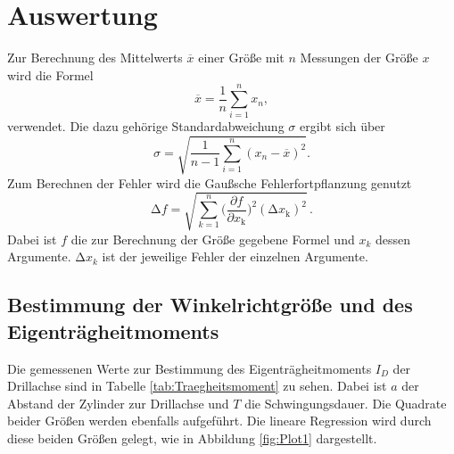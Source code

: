 \section{Auswertung}
\label{sec:Auswertung}
Zur Berechnung des Mittelwerts $\overline{x}$ einer Größe mit $n$ Messungen der Größe $x$ wird die Formel 
\begin{equation}
  \overline{x}=\frac{1}{n}\sum_{i=1}^n x_n,
  \label{eq:Mittelwert}
\end{equation} verwendet.
Die dazu gehörige Standardabweichung $\sigma$ ergibt sich über 
\begin{equation}
  \sigma=\sqrt{\frac{1}{n-1}\sum_{i=1}^n(x_n-\overline{x})^2}.
  \label{eq:Standardabweichung}
\end{equation}
Zum Berechnen der Fehler wird die Gaußsche Fehlerfortpflanzung genutzt 
\begin{equation}
\increment f=\sqrt{\sum_{k=1}^{n}\biggl(\frac{\partial f}{\partial x_\text{k}}\biggr)^2(\increment x_\text{k})^2}\,.
\label{eq:gauss}
\end{equation}
Dabei ist $f$ die zur Berechnung der Größe gegebene Formel und $x_k$ dessen Argumente.
$\increment x_k$ ist der jeweilige Fehler der einzelnen Argumente.\\ \noindent 
\newpage

\subsection{Bestimmung der Winkelrichtgröße und des Eigenträgheitmoments}

Die gemessenen Werte zur Bestimmung des Eigenträgheitmoments $I_D$ der Drillachse sind in Tabelle \ref{tab:Traegheitsmoment} zu sehen.
Dabei ist $a$ der Abstand der Zylinder zur Drillachse und $T$ die Schwingungsdauer.
Die Quadrate beider Größen werden ebenfalls aufgeführt.
Die lineare Regression wird durch diese beiden Größen gelegt, wie in Abbildung \ref{fig:Plot1} dargestellt.

